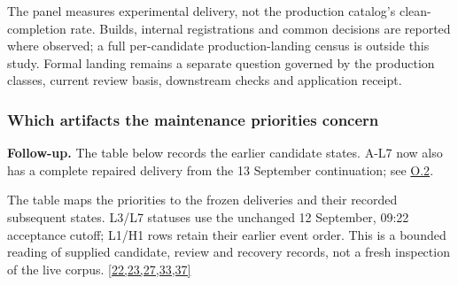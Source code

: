 The panel measures experimental delivery, not the production catalog's clean-completion rate. Builds, internal registrations and common decisions are reported where observed; a full per-candidate production-landing census is outside this study. Formal landing remains a separate question governed by the production classes, current review basis, downstream checks and application receipt.

\subsubsection[Which artifacts the maintenance priorities concern]{\texorpdfstring{\protect\hypertarget{n2-1}{}Which artifacts the maintenance priorities concern}{Which artifacts the maintenance priorities concern}}
\textbf{Follow-up.} The table below records the earlier candidate states. A-L7 now also has a complete repaired delivery from the 13 September continuation; see \hyperlink{o2}{O.2}.

The table maps the priorities to the frozen deliveries and their recorded subsequent states. L3/L7 statuses use the unchanged 12 September, 09:22 acceptance cutoff; L1/H1 rows retain their earlier event order. This is a bounded reading of supplied candidate, review and recovery records, not a fresh inspection of the live corpus. \href{en.pdf\#ref-22}{\mbox{[22,23,27,33,37]}}

